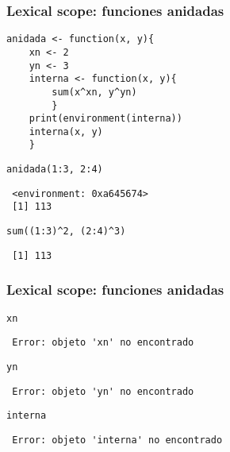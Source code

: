 \documentclass[xcolor={usenames,svgnames,dvipsnames}]{beamer}
\begin{document}
\begin{frame}[fragile]
\frametitle{Lexical scope: funciones anidadas}
\label{sec-2-3}


\lstset{language=R}
\begin{lstlisting}
anidada <- function(x, y){
    xn <- 2
    yn <- 3
    interna <- function(x, y){
        sum(x^xn, y^yn)
        }
    print(environment(interna))
    interna(x, y)
    }
\end{lstlisting}



\lstset{language=R}
\begin{lstlisting}
anidada(1:3, 2:4)
\end{lstlisting}

\begin{verbatim}
 <environment: 0xa645674>
 [1] 113
\end{verbatim}


\lstset{language=R}
\begin{lstlisting}
sum((1:3)^2, (2:4)^3)
\end{lstlisting}

\begin{verbatim}
 [1] 113
\end{verbatim}
\end{frame}
\begin{frame}[fragile]
\frametitle{Lexical scope: funciones anidadas}
\label{sec-2-4}


\lstset{language=R}
\begin{lstlisting}
xn
\end{lstlisting}

\begin{verbatim}
 Error: objeto 'xn' no encontrado
\end{verbatim}


\lstset{language=R}
\begin{lstlisting}
yn
\end{lstlisting}

\begin{verbatim}
 Error: objeto 'yn' no encontrado
\end{verbatim}


\lstset{language=R}
\begin{lstlisting}
interna
\end{lstlisting}

\begin{verbatim}
 Error: objeto 'interna' no encontrado
\end{verbatim}
\end{frame}
\end{document}
